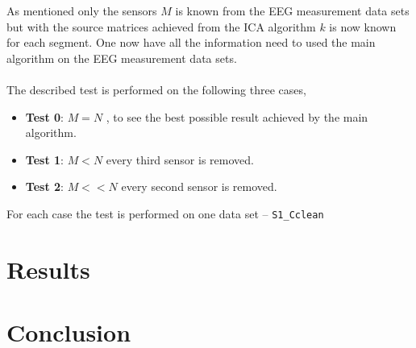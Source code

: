 As mentioned only the sensors $M$ is known from the EEG measurement data sets but with the source matrices achieved from the ICA algorithm $k$ is now known for each segment. One now have all the information need to used the main algorithm on the EEG measurement data sets. 
\\ \\
The described test is performed on the following three cases,
\begin{itemize}
\item \textbf{Test 0}: $M = N$ , to see the best possible result achieved by the main algorithm. 
\item \textbf{Test 1}: $M < N$ every third sensor is removed. 
\item \textbf{Test 2}: $M << N$ every second sensor is removed.
\end{itemize}
For each case the test is performed on one data set -- \texttt{S1\_Cclean} 

\section{Results}




\section{Conclusion}